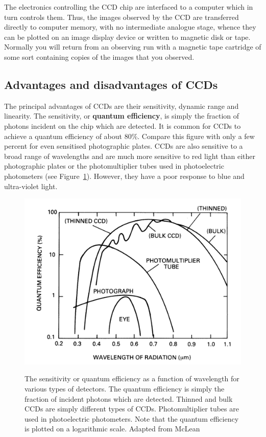 \documentclass[twoside,11pt]{starlink}
\begin{document}
The electronics controlling the CCD chip are interfaced to a computer
which in turn controls them.  Thus, the images observed by the CCD are
transferred directly to computer memory, with no intermediate analogue
stage, whence they can be plotted on an image display device or written
to magnetic disk or tape.  Normally you will return from an observing
run with a magnetic tape cartridge of some sort containing copies of the
images that you observed.

\subsection{\label{ADDIS}Advantages and disadvantages of CCDs}

The principal advantages of CCDs are their sensitivity, dynamic range
and linearity.  The sensitivity, or \textbf{quantum efficiency}, is simply
the fraction of photons incident on the chip which are detected.
It is common for CCDs to achieve a quantum efficiency of about 80\%.
Compare this figure with only a few percent for even sensitised
photographic plates.  CCDs are also sensitive to a broad range of
wavelengths and are much more sensitive to red light than either
photographic plates or the photomultiplier tubes used in photoelectric
photometers (see Figure~\ref{SENSITIVITY}).  However, they have a poor
response to blue and ultra-violet light.

\begin{figure}[htbp]
   \centering
   \includegraphics[totalheight=3in]{sc5_sensitivity}
   \begin{quote}
   \caption[The wavelength sensitivity of various types of detectors]{The
    sensitivity or quantum efficiency as a function of wavelength for various
    types of detectors.  The quantum efficiency is simply the fraction of
    incident photons which are detected.  Thinned and bulk CCDs are simply
    different types of CCDs.  Photomultiplier tubes are used in
    photoelectric photometers.  Note that the quantum efficiency is plotted
    on a logarithmic scale.  Adapted from McLean\cite{MCLEAN89, MCLEAN97}
   \label{SENSITIVITY} }
   \end{quote}
\end{figure}
\end{document}
